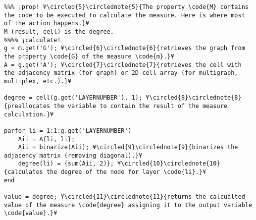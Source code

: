 \documentclass{tufte-handout}
\begin{document}
\begin{lstlisting}
%%% ¡prop! ¥\circled{5}\circlednote{5}{The property \code{M} contains the code to be executed to calculate the measure. Here is where most of the action happens.}¥
M (result, cell) is the degree.
%%%% ¡calculate!
g = m.get('G'); ¥\circled{6}\circlednote{6}{retrieves the graph from the property \code{G} of the measure \code{m}.}¥
A = g.get('A'); ¥\circled{7}\circlednote{7}{retrieves the cell with the adjacency matrix (for graph) or 2D-cell array (for multigraph, multiplex, etc.).}¥

degree = cell(g.get('LAYERNUMBER'), 1); ¥\circled{8}\circlednote{8}{preallocates the variable to contain the result of the measure calculation.}¥

parfor li = 1:1:g.get('LAYERNUMBER')
    Aii = A{li, li};
    Aii = binarize(Aii); ¥\circled{9}\circlednote{9}{binarizes the adjacency matrix (removing diagonal).}¥
    degree(li) = {sum(Aii, 2)}; ¥\circled{10}\circlednote{10}{calculates the degree of the node for layer \code{li}.}¥
end

value = degree; ¥\circled{11}\circlednote{11}{returns the calcualted value of the measure \code{degree} assigning it to the output variable \code{value}.}¥
\end{lstlisting}
\end{document}
